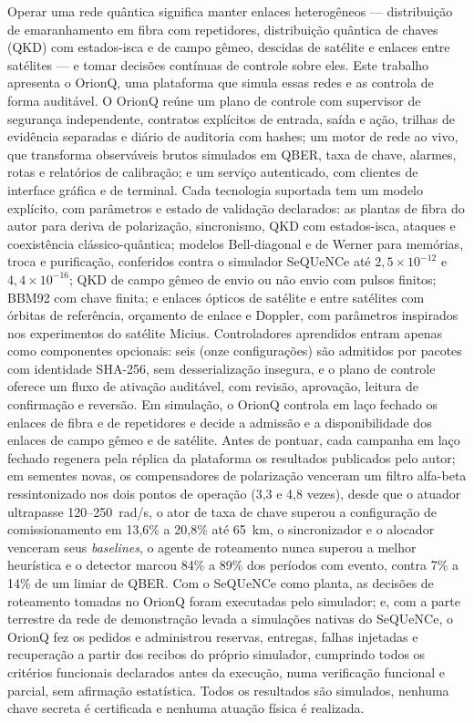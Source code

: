 \documentclass[12pt]{article}
\begin{document}
\begin{resumo}
Operar uma rede quântica significa manter enlaces heterogêneos --- distribuição
de emaranhamento em fibra com repetidores, distribuição quântica de chaves (QKD)
com estados-isca e de campo gêmeo, descidas de satélite e enlaces entre
satélites --- e tomar decisões contínuas de controle sobre eles. Este trabalho
apresenta o OrionQ, uma plataforma que simula essas redes e as controla de forma
auditável. O OrionQ reúne um plano de controle com supervisor de segurança
independente, contratos explícitos de entrada, saída e ação, trilhas de
evidência separadas e diário de auditoria com hashes; um motor de rede ao vivo,
que transforma observáveis brutos simulados em QBER, taxa de chave, alarmes,
rotas e relatórios de calibração; e um serviço autenticado, com clientes de
interface gráfica e de terminal. Cada tecnologia suportada tem um modelo
explícito, com parâmetros e estado de validação declarados: as plantas de fibra
do autor para deriva de polarização, sincronismo, QKD com estados-isca, ataques
e coexistência clássico-quântica; modelos Bell-diagonal e de Werner para
memórias, troca e purificação, conferidos contra o simulador SeQUeNCe até
$2{,}5\times10^{-12}$ e $4{,}4\times10^{-16}$; QKD de campo gêmeo de envio ou não
envio com pulsos finitos; BBM92 com chave finita; e enlaces ópticos de satélite e
entre satélites com órbitas de referência, orçamento de enlace e Doppler, com
parâmetros inspirados nos experimentos do satélite Micius. Controladores
aprendidos entram apenas como componentes opcionais: seis (onze configurações)
são admitidos por pacotes com identidade SHA-256, sem desserialização insegura,
e o plano de controle oferece um fluxo de ativação auditável, com revisão,
aprovação, leitura de confirmação e reversão. Em simulação, o OrionQ controla em
laço fechado os enlaces de fibra e de repetidores e decide a admissão e a
disponibilidade dos enlaces de campo gêmeo e de satélite. Antes de pontuar, cada
campanha em laço fechado regenera pela réplica da plataforma os resultados
publicados pelo autor; em sementes novas, os compensadores de polarização
venceram um filtro alfa-beta ressintonizado nos dois pontos de operação (3,3 e
4,8 vezes), desde que o atuador ultrapasse 120--250~rad/s, o ator de taxa de chave superou a configuração de comissionamento em
13,6\% a 20,8\% até 65~km, o sincronizador e o alocador venceram seus
\textit{baselines}, o agente de roteamento nunca superou a melhor heurística e o
detector marcou 84\% a 89\% dos períodos com evento, contra 7\% a 14\% de um
limiar de QBER. Com o SeQUeNCe como planta, as decisões de roteamento tomadas no
OrionQ foram executadas pelo simulador; e, com a parte terrestre da rede de
demonstração levada a simulações nativas do SeQUeNCe, o OrionQ fez os pedidos e
administrou reservas, entregas, falhas injetadas e recuperação a partir dos
recibos do próprio simulador, cumprindo todos os critérios funcionais
declarados antes da execução, numa verificação funcional e parcial, sem
afirmação estatística. Todos os resultados são simulados, nenhuma chave
secreta é certificada e nenhuma atuação física é realizada.
\end{resumo}
\end{document}
